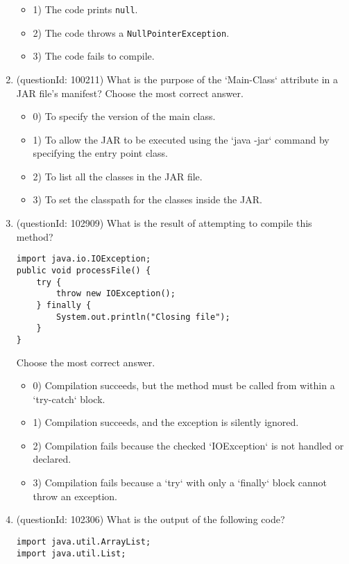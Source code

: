 \documentclass[12pt]{article}
\begin{document}
\begin{enumerate}[label=(\arabic*)]
\begin{itemize}
\item 1) The code prints \verb|null|.

\item 2) The code throws a \verb|NullPointerException|.

\item 3) The code fails to compile.

\end{itemize}
\item (questionId: 100211) What is the purpose of the `Main-Class` attribute in a JAR file's manifest?
Choose the most correct answer. 
\begin{itemize}
\item 0) To specify the version of the main class.

\item 1) To allow the JAR to be executed using the `java -jar` command by specifying the entry point class.

\item 2) To list all the classes in the JAR file.

\item 3) To set the classpath for the classes inside the JAR.

\end{itemize}
\item (questionId: 102909) What is the result of attempting to compile this method?
\begin{verbatim}
import java.io.IOException;
public void processFile() {
    try {
        throw new IOException();
    } finally {
        System.out.println("Closing file");
    }
}
\end{verbatim}
Choose the most correct answer. 
\begin{itemize}
\item 0) Compilation succeeds, but the method must be called from within a `try-catch` block.

\item 1) Compilation succeeds, and the exception is silently ignored.

\item 2) Compilation fails because the checked `IOException` is not handled or declared.

\item 3) Compilation fails because a `try` with only a `finally` block cannot throw an exception.

\end{itemize}
\item (questionId: 102306) What is the output of the following code?\n\begin{verbatim}
import java.util.ArrayList;
import java.util.List;


\end{verbatim}
\end{enumerate}
\end{document}
